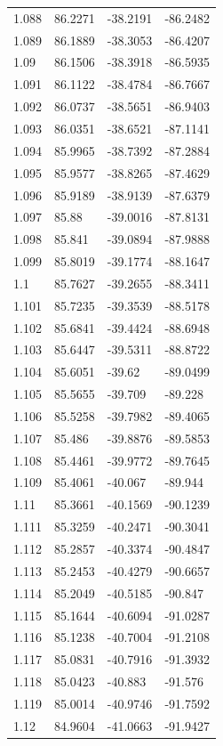 \begin{tabular}{llll}
1.088 & 86.2271 & -38.2191 & -86.2482 \\
1.089 & 86.1889 & -38.3053 & -86.4207 \\
1.09 & 86.1506 & -38.3918 & -86.5935 \\
1.091 & 86.1122 & -38.4784 & -86.7667 \\
1.092 & 86.0737 & -38.5651 & -86.9403 \\
1.093 & 86.0351 & -38.6521 & -87.1141 \\
1.094 & 85.9965 & -38.7392 & -87.2884 \\
1.095 & 85.9577 & -38.8265 & -87.4629 \\
1.096 & 85.9189 & -38.9139 & -87.6379 \\
1.097 & 85.88 & -39.0016 & -87.8131 \\
1.098 & 85.841 & -39.0894 & -87.9888 \\
1.099 & 85.8019 & -39.1774 & -88.1647 \\
1.1 & 85.7627 & -39.2655 & -88.3411 \\
1.101 & 85.7235 & -39.3539 & -88.5178 \\
1.102 & 85.6841 & -39.4424 & -88.6948 \\
1.103 & 85.6447 & -39.5311 & -88.8722 \\
1.104 & 85.6051 & -39.62 & -89.0499 \\
1.105 & 85.5655 & -39.709 & -89.228 \\
1.106 & 85.5258 & -39.7982 & -89.4065 \\
1.107 & 85.486 & -39.8876 & -89.5853 \\
1.108 & 85.4461 & -39.9772 & -89.7645 \\
1.109 & 85.4061 & -40.067 & -89.944 \\
1.11 & 85.3661 & -40.1569 & -90.1239 \\
1.111 & 85.3259 & -40.2471 & -90.3041 \\
1.112 & 85.2857 & -40.3374 & -90.4847 \\
1.113 & 85.2453 & -40.4279 & -90.6657 \\
1.114 & 85.2049 & -40.5185 & -90.847 \\
1.115 & 85.1644 & -40.6094 & -91.0287 \\
1.116 & 85.1238 & -40.7004 & -91.2108 \\
1.117 & 85.0831 & -40.7916 & -91.3932 \\
1.118 & 85.0423 & -40.883 & -91.576 \\
1.119 & 85.0014 & -40.9746 & -91.7592 \\
1.12 & 84.9604 & -41.0663 & -91.9427 \\

\end{tabular}
